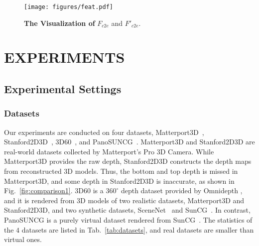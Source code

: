 \documentclass[letterpaper, 10 pt, conference]{ieeeconf}
\begin{document}
\begin{figure}[t]
\vspace{5pt}
\begin{center}
\texttt{[image: figures/feat.pdf]}
\end{center}
\caption{\textbf{The Visualization of} $F_{c2e}$ and $F'_{c2e}$.}
\label{fig:feat}
\end{figure}


\section{EXPERIMENTS}

\subsection{Experimental Settings}


\subsubsection{Datasets}
Our experiments are conducted on four datasets, Matterport3D~\cite{Matterport3D}, Stanford2D3D~\cite{armeni2017joint}, 3D60~\cite{zioulis2018omnidepth}, and PanoSUNCG~\cite{wang2018self}. Matterport3D and Stanford2D3D are real-world datasets collected by Matterport’s Pro 3D Camera. While Matterport3D provides the raw depth, Stanford2D3D constructs the depth maps from reconstructed 3D models. Thus, the bottom and top depth is missed in Matterport3D, and some depth in Stanford2D3D is inaccurate, as shown in Fig.~\ref{fig:comparison1}. 3D60 is a $360^{\circ}$ depth dataset provided by Omnidepth \cite{zioulis2018omnidepth}, and it is rendered from 3D models of two realistic datasets, Matterport3D and Stanford2D3D, and two synthetic datasets, SceneNet~\cite{handa2016scenenet} and SunCG~\cite{song2017semantic}. In contrast, PanoSUNCG is a purely virtual dataset rendered from SunCG~\cite{song2017semantic}. The statistics of the $4$ datasets are listed in Tab.~\ref{tab:datasets}, and real datasets are smaller than virtual ones. 
\end{document}
